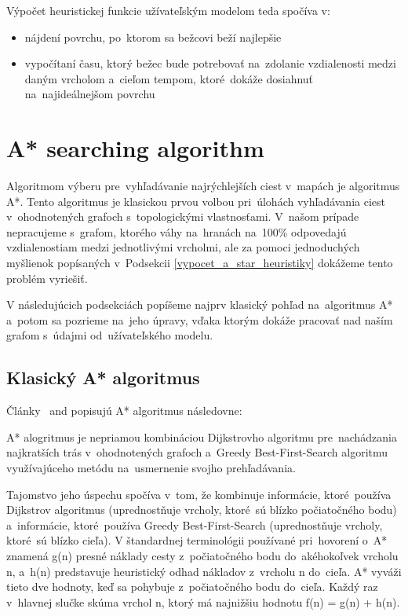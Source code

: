 Výpočet heuristickej funkcie užívateľským modelom teda spočíva v:
\begin{itemize}
    \item nájdení povrchu, po~ktorom sa bežcovi beží najlepšie
    \item vypočítaní času, ktorý bežec bude potrebovať na~zdolanie vzdialenosti medzi daným vrcholom a~cieľom tempom, ktoré~dokáže dosiahnuť na~najideálnejšom povrchu 
\end{itemize}

\section{A* searching algorithm}

Algoritmom výberu pre~vyhľadávanie najrýchlejších ciest v~mapách je algoritmus A*. Tento algoritmus je klasickou prvou volbou pri~úlohách vyhľadávania ciest v~ohodnotených grafoch s~topologickými vlastnosťami. V~našom prípade nepracujeme s~grafom, ktorého váhy na~hranách na~100\% odpovedajú vzdialenostiam medzi jednotlivými vrcholmi, ale za pomoci jednoduchých myšlienok popísaných v~Podsekcii \ref{vypocet_a_star_heuristiky} dokážeme tento problém vyriešiť. 

V následujúcich podsekciách popíšeme najprv klasický pohľad na~algoritmus A* a~potom sa pozrieme na~jeho úpravy, vďaka ktorým dokáže pracovať nad naším grafom s~údajmi od~užívateľského modelu.

\subsection{Klasický A* algoritmus}\label{klasicky_a_star_algoritmus}

Články~\cite{IntrodutionToAStar} and \cite{Heuristics} popisujú A* algoritmus následovne:

A* alogritmus je nepriamou kombináciou Dijkstrovho algoritmu pre~nachádzania najkratších trás v~ohodnotených grafoch a~Greedy Best-First-Search algoritmu využívajúceho metódu na~usmernenie svojho prehľadávania.

Tajomstvo jeho úspechu spočíva v~tom, že kombinuje informácie, ktoré~používa Dijkstrov algoritmus (uprednostňuje vrcholy, ktoré~sú blízko počiatočného bodu) a~informácie, ktoré~používa Greedy Best-First-Search (uprednostňuje vrcholy, ktoré~sú blízko cieľa).
V štandardnej terminológii používané pri~hovorení o~A* znamená g(n) presné náklady cesty z~počiatočného bodu do~akéhokoľvek vrcholu n, a~h(n) predstavuje heuristický odhad nákladov z~vrcholu n do~cieľa.  A* vyváži tieto dve hodnoty, keď sa pohybuje z~počiatočného bodu do~cieľa. Každý raz v~hlavnej slučke skúma vrchol n, ktorý má najnižšiu hodnotu f(n) = g(n) + h(n).

